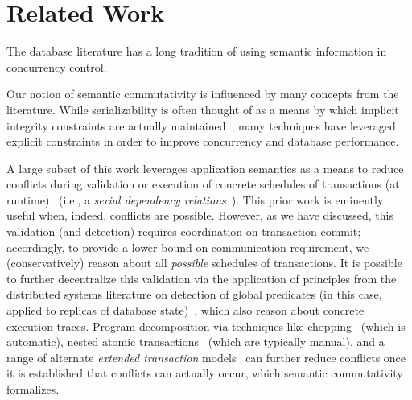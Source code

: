 
\section{Related Work}
\label{sec:relatedwork}


The database literature has a long tradition of using semantic
information in concurrency control.

 Our notion of semantic
commutativity is influenced by many concepts from the
literature. While serializability is often thought of as a means by
which implicit integrity constraints are actually
maintained~\cite{gray-virtues}, many techniques have leveraged
explicit constraints in order to improve concurrency and database
performance.

A large subset of this work leverages application semantics as a means
to reduce conflicts during validation or execution of concrete
schedules of transactions (at
runtime)~\cite{weihl-thesis,badrinath-semantics} (i.e., a
\textit{serial dependency relations}~\cite{herlihy-apologizing}). This
prior work is eminently useful when, indeed, conflicts are
possible. However, as we have discussed, this validation (and
detection) requires coordination on transaction commit; accordingly,
to provide a lower bound on communication requirement, we
(conservatively) reason about all \textit{possible} schedules of
transactions.  It is possible to further decentralize this validation
via the application of principles from the distributed systems
literature on detection of global predicates (in this case, applied to
replicas of database state)~\cite{globalpredicates}, which also reason
about concrete execution traces. Program decomposition via techniques
like chopping~\cite{chopping} (which is automatic), nested atomic
transactions~\cite{atomictransactions} (which are typically manual),
and a range of alternate \textit{extended transaction}
models~\cite{acta} can further reduce conflicts once it is established
that conflicts can actually occur, which semantic commutativity
formalizes.


